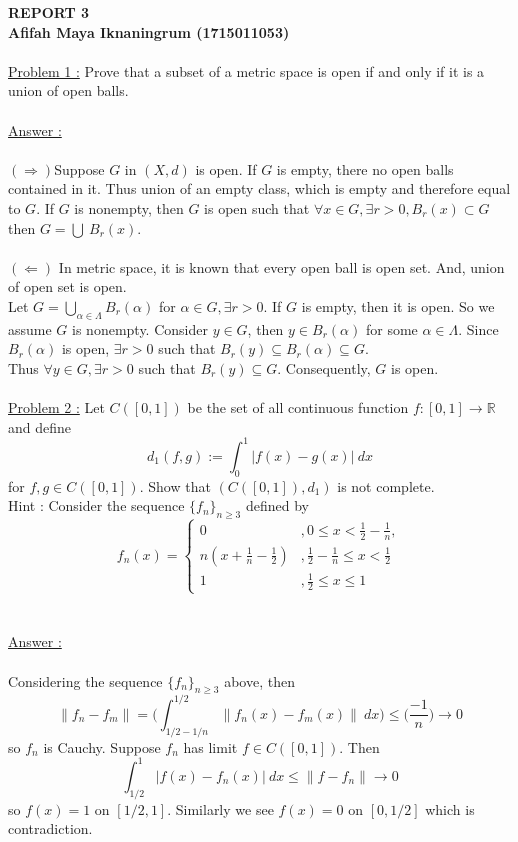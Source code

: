 \documentclass[a4paper,10pt]{article}
\newcommand{\R}{\mathbb{R}}
\begin{document}
\newpage
\textbf{REPORT 3 \\ Afifah Maya Iknaningrum (1715011053)}\\ \\

\underline{Problem 1 :} Prove that a subset of a metric space is open if and only if it is a union of open balls. \\ \\
\underline{Answer :} \\ \\
$ (\Rightarrow) $Suppose $ G $ in $ (X,d) $ is open. If $ G $ is empty, there no open balls contained in it. Thus union of an empty class, which is empty and therefore equal to $ G $. If $ G $ is nonempty, then $ G $ is open such that $ \forall x \in G , \exists r>0, B_{r}(x) \subset G $ then $ G = \bigcup \ B_{r}(x) $.\\ \\
$ (\Leftarrow) $ In metric space, it is known that every open ball is open set. And, union of open set is open.\\
Let $ G = \bigcup\limits_{\alpha \in \Lambda} B_{r}(\alpha) $ for $ \alpha \in G, \exists r>0 $. If $ G $ is empty, then it is open. So we assume $ G $ is nonempty. Consider $ y \in G $, then $ y \in B_{r}(\alpha) $ for some $ \alpha \in \Lambda $. Since $ B_{r}(\alpha) $ is open, $ \exists r > 0 $ such that $ B_{r}(y) \subseteq B_{r}(\alpha) \subseteq G $. \\
Thus $ \forall y \in G , \exists r>0 $ such that $ B_{r}(y) \subseteq G $. Consequently, $ G $ is open. \\ \\ 

\underline{Problem 2 :} Let $ C([0,1]) $ be the set of all continuous function $ f : [0,1] \rightarrow \R $ and define 
\[ d_{1}(f,g) := \int_{0}^{1} |f(x)-g(x)| \ dx \]
for $ f,g \in C([0,1]) $. Show that $ (C([0,1]),d_{1}) $ is not complete.\\
Hint : Consider the sequence $ \{f_{n}\}_{n\geq 3} $ defined by
\[ f_{n}(x) = \begin{cases}
0 &, 0 \leq x < \frac{1}{2} - \frac{1}{n}, \\
n(x+\frac{1}{n}-\frac{1}{2}) &,  \frac{1}{2} - \frac{1}{n} \leq x < \frac{1}{2} \\
1 &, \frac{1}{2}\leq x \leq 1
\end{cases} \]\\ \\
\underline{Answer :} \\ \\
Considering the sequence $ \{f_{n}\}_{n\geq 3} $ above, then
\[ \|f_{n}-f_{m}\| = \Big(\int_{1/2-1/n}^{1/2} \| f_{n}(x)-f_{m}(x)\| \ dx\Big) \leq \big(\dfrac{-1}{n}\big) \rightarrow 0  \]
so $ f_{n} $ is Cauchy. Suppose $ f_{n} $ has limit $ f \in C([0,1]) $. Then
\[ \int_{1/2}^{1} |f(x)-f_{n}(x)| \ dx \leq \|f-f_{n}\| \rightarrow 0 \]
so $ f(x) =1 $ on $ [1/2,1] $. Similarly we see $ f(x) = 0 $ on $ [0,1/2] $ which is contradiction.
\end{document}
